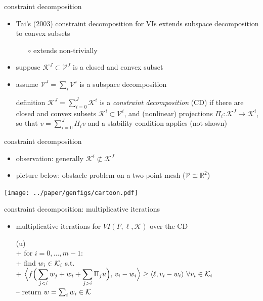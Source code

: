 \documentclass[svgnames,
               hyperref={colorlinks,citecolor=DeepPink4,linkcolor=FireBrick,urlcolor=Maroon},
               usepdftitle=false]  %
               {beamer}
\newcommand{\RR}{\mathbb{R}}
\newcommand{\ip}[2]{\left<#1,#2\right>}
\newcommand{\ds}{\displaystyle}
\begin{document}
\begin{frame}{constraint decomposition}

\begin{itemize}
\item Tai's (2003) constraint decomposition for VIs extends subspace decomposition to convex subsets
    \begin{itemize}
    \item[$\circ$] extends non-trivially
    \end{itemize}
\item suppose $\mathcal{K}^J \subset \mathcal{V}^J$ is a closed and convex subset
\item assume $\mathcal{V}^J = \sum_i\mathcal{V}^i$ is a subspace decomposition
\begin{block}{definition}
$\ds \mathcal{K}^J = \sum_{i=0}^J \mathcal{K}^i$ \quad is a \emph{constraint decomposition} (CD) if there are closed and convex subsets $\mathcal{K}^i\subset \mathcal{V}^i$, and (nonlinear) projections $\Pi_i : \mathcal{K}^J \to \mathcal{K}^i$, so that $\ds v = \sum_{i=0}^J \Pi_i v$ and a stability condition applies (not shown)
\end{block}
\end{itemize}
\end{frame}


\begin{frame}{constraint decomposition}

\begin{itemize}
\item observation: generally $\mathcal{K}^i \not\subset \mathcal{K}^J$
\item picture below: obstacle problem on a two-point mesh ($\mathcal{V} \cong \RR^2$)
\end{itemize}

\bigskip
\begin{center}
\texttt{[image: ../paper/genfigs/cartoon.pdf]}
\end{center}
\end{frame}


\begin{frame}{constraint decomposition: multiplicative iterations}

\begin{itemize}
\item multiplicative iterations for $VI(F,\ell,\mathcal{K})$ over the CD

{\small
\begin{pseudo}[left-margin=-5mm]
(u)\text{:} \\+
    for $i = 0,\dots,m-1$: \\+
        find $w_i\in \mathcal{K}_i$ s.t. \\+
            $\displaystyle \Big<f\Big(\sum_{j<i} w_j + w_i + \sum_{j>i} \Pi_j u\Big),\, v_i - w_i\Big> \ge \ip{\ell}{v_i - w_i} \,\forall v_i \in \cK_i$ \\--
    return $w=\sum_i w_i\in\mathcal{K}$
\end{pseudo}
}
\end{itemize}
\end{frame}
\end{document}
